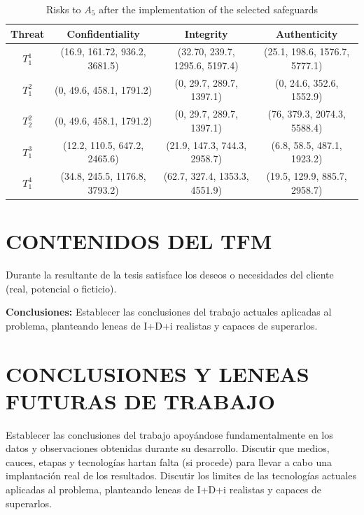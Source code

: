 {{\begin{table}[htb]
\centering
\caption{Risks to $A_5$ after the implementation of the selected safeguards }
\label{table:risk}
\begin{tabular}{cccc}
\hline
\noalign{\smallskip}
{\scriptsize{Threat}}& {\scriptsize{Confidentiality}} & {\scriptsize{Integrity}} & {\scriptsize{Authenticity}}\tabularnewline
\hline
{\scriptsize{$T_{1}^{1}$}} & \scriptsize{(16.9, 161.72, 936.2, 3681.5)} & \scriptsize{(32.70, 239.7, 1295.6, 5197.4)} & \scriptsize{(25.1, 198.6, 1576.7, 5777.1)}\\
{\scriptsize{$T_{1}^{2}$}} & \scriptsize{(0, 49.6, 458.1, 1791.2)} & \scriptsize{(0, 29.7, 289.7, 1397.1)} & \scriptsize{(0, 24.6, 352.6, 1552.9)}\\
{\scriptsize{$T_{2}^{2}$}} & \scriptsize{(0, 49.6, 458.1, 1791.2)} & \scriptsize{(0, 29.7, 289.7, 1397.1)} & \scriptsize{(76, 379.3, 2074.3, 5588.4)}\\
{\scriptsize{$T_{1}^{3}$}} & \scriptsize{(12.2, 110.5, 647.2, 2465.6)} & \scriptsize{(21.9, 147.3, 744.3, 2958.7)} & \scriptsize{(6.8, 58.5, 487.1, 1923.2)}\\
{\scriptsize{$T_{1}^{4}$}} & \scriptsize{(34.8, 245.5, 1176.8, 3793.2)} & \scriptsize{(62.7, 327.4, 1353.3, 4551.9)} & \scriptsize{(19.5, 129.9, 885.7, 2958.7)}\\
\hline
\end{tabular}
\end{table}


\section{CONTENIDOS DEL TFM}
Durante la resultante de la tesis satisface los deseos o necesidades del cliente (real, potencial o ficticio).

{\bf Conclusiones:}
Establecer las conclusiones del trabajo actuales aplicadas al problema, planteando leneas de I+D+i realistas y capaces de superarlos.

\section{CONCLUSIONES Y LENEAS FUTURAS DE TRABAJO}
Establecer las conclusiones del trabajo apoyándose fundamentalmente en los datos y observaciones obtenidas durante su desarrollo. Discutir que medios, cauces, etapas y tecnologías hartan falta (si procede) para llevar a cabo una implantación real de los resultados.
Discutir los limites de las tecnologías actuales aplicadas al problema, planteando leneas de I+D+i realistas y capaces de superarlos.

}}
